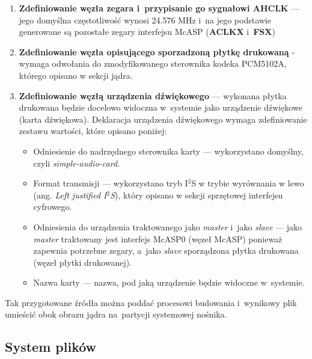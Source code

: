 \begin{enumerate}
\begin{itemize}
    \end{itemize}

    \item \textbf{Zdefiniowanie węzła zegara i~przypisanie go sygnałowi
    \textbf{AHCLK}} --- jego domyślna częstotliwość wynosi 24.576 MHz i~na jego
    podstawie generowane są pozostałe zegary interfejsu McASP (\textbf{ACLKX}
    i~\textbf{FSX})

    \item \textbf{Zdefiniowanie węzła opisującego sporzadzoną płytkę drukowaną}
    - wymaga odwołania do zmodyfikowanego sterownika kodeka PCM5102A, którego
    opisano w sekcji jądra.

    \item \textbf{Zdefiniowanie węzłą urządzenia dźwiękowego} --- wykonana
    płytka drukowana będzie docelowo widoczna w~systemie jako urządzenie
    dźwiękowe (karta dźwiękowa). Deklaracja urządzenia dźwiękowego wymaga
    zdefiniowanie zestawu wartości, które opisano poniżej:
    \begin{itemize}

        \item Odniesienie do nadrzędnego sterownika karty --- wykorzystano
        domyślny, czyli \textit{simple-audio-card}.

        \item Format transmisji --- wykorzystano tryb I$^2$S w trybie wyrównania
        w lewo (ang. \textit{Left justified I$^2$S}), który opisano w sekcji
        sprzętowej interfejsu cyfrowego.

        \item Odniesienia do urządzenia traktowanego jako \textit{master} i~jako
        \textit{slave} --- jako \textit{master} traktowany jest interfejs McASP0
        (węzeł McASP) ponieważ zapewnia potrzebne zegary, a~jako \textit{slave}
        sporządzona płytka drukowana (węzeł płytki drukowanej).

        \item Nazwa karty --- nazwa, pod jaką urządzenie będzie widoczne
        w~systemie.

    \end{itemize}

\end{enumerate}

Tak przygotowane źródła można poddać procesowi budowania i~wynikowy plik
umieścić obok obrazu jądra na~partycji systemowej nośnika.

\subsection{System plików}


